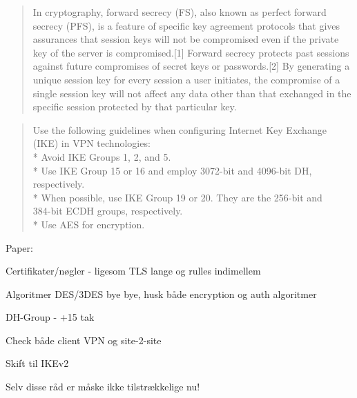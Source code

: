 \documentclass[Screen16to9,17pt]{foils}
\begin{document}

\begin{quote}
In cryptography, forward secrecy (FS), also known as perfect forward secrecy (PFS), is a feature of specific key agreement protocols that gives assurances that session keys will not be compromised even if the private key of the server is compromised.[1] Forward secrecy protects past sessions against future compromises of secret keys or passwords.[2] By generating a unique session key for every session a user initiates, the compromise of a single session key will not affect any data other than that exchanged in the specific session protected by that particular key.
\end{quote}

\begin{list2}
  \item {}
\end{list2}




\begin{quote}\small
  Use the following guidelines when configuring Internet Key Exchange (IKE) in VPN technologies:\\
* Avoid IKE Groups 1, 2, and 5.\\
* Use IKE Group 15 or 16 and employ 3072-bit and 4096-bit DH, respectively.\\
* When possible, use IKE Group 19 or 20. They are the 256-bit and \\
384-bit ECDH groups, respectively.\\
* Use AES for encryption.
\end{quote}
Paper:
{\small {}}

\begin{list2}
\item Certifikater/nøgler - ligesom TLS lange og rulles indimellem
\item Algoritmer DES/3DES bye bye, husk både encryption og auth algoritmer
\item DH-Group - +15 tak
\item Check både client VPN og site-2-site
\item Skift til IKEv2
\item Selv disse råd er måske ikke tilstrækkelige nu!
\end{list2}
\end{document}
